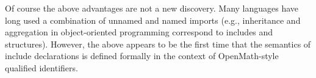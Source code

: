 Of course the above advantages are not a new discovery.
Many languages have long used a combination of unnamed and named imports (e.g., inheritance and aggregation in object-oriented programming correspond to includes and structures).
However, the above appears to be the first time that the semantics of include declarations is defined formally in the context of OpenMath-style qualified identifiers.

%
